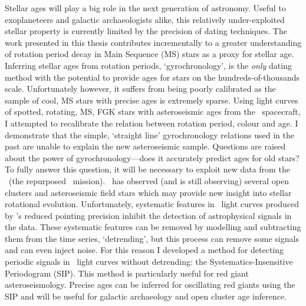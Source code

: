 %
%
%

Stellar ages will play a big role in the next generation of astronomy.
Useful to exoplaneteers and galactic archaeologists alike, this relatively
under-exploited stellar property is currently limited by the precision of
dating techniques.
The work presented in this thesis contributes incrementally to a greater
understanding of rotation period decay in Main Sequence (MS) stars as a proxy
for stellar age.
Inferring stellar ages from rotation periods, `gyrochronology', is the {\it
only} dating method with the potential to provide ages for stars on the
hundreds-of-thousands scale.
Unfortunately however, it suffers from being poorly calibrated as the sample
of cool, MS stars with precise ages is extremely sparse.
Using light curves of spotted, rotating, MS, FGK stars with asteroseismic ages
from the \kepler\ spacecraft, I attempted to recalibrate the relation between
rotation period, colour and age.
I demonstrate that the simple, `straight line' gyrochronology relations used
in the past are unable to explain the new asteroseismic sample.
Questions are raised about the power of gyrochronology---does it accurately
predict ages for old stars?
To fully answer this question, it will be necessary to exploit new data from
the \ktwo\ (the repurposed \kepler\ mission).
\ktwo\ has observed (and is still observing) several open clusters and
asteroseismic field stars which may provide new insight into stellar
rotational evolution.
Unfortunately, systematic features in \ktwo\ light curves produced by
\kepler's reduced pointing precision inhibit the detection of astrophysical
signals in the data.
These systematic features can be removed by modelling and subtracting them
from the time series, `detrending', but this process can remove some signals
and can even inject noise.
For this reason I developed a method for detecting periodic signals in \ktwo\
light curves without detrending: the Systematics-Insensitive Periodogram
(SIP).
This method is particularly useful for red giant asteroseismology.
Precise ages can be inferred for oscillating red giants using the SIP and will
be useful for galactic archaeology and open cluster age inference.
